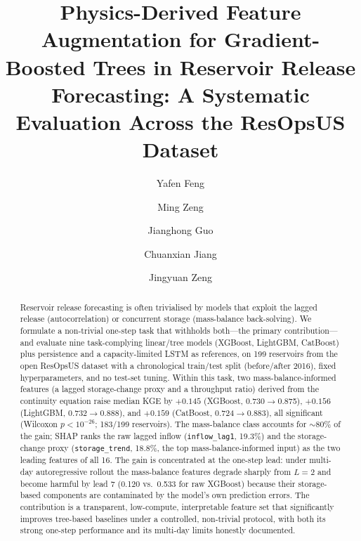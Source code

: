 \documentclass[journal]{ascelike-new}
\begin{document}
\title{Physics-Derived Feature Augmentation for Gradient-Boosted Trees in Reservoir Release Forecasting: A Systematic Evaluation Across the ResOpsUS Dataset}
\author[1,*]{Yafen Feng}
\author[2]{Ming Zeng}
\author[3]{Jianghong Guo}
\author[3]{Chuanxian Jiang}
\author[3,*]{Jingyuan Zeng}
\maketitle
\begin{abstract}
Reservoir release forecasting is often trivialised by models that exploit the lagged release (autocorrelation) or concurrent storage (mass-balance back-solving). We formulate a non-trivial one-step task that withholds both---the primary contribution---and evaluate nine task-complying linear/tree models (XGBoost, LightGBM, CatBoost) plus persistence and a capacity-limited LSTM as references, on 199 reservoirs from the open ResOpsUS dataset with a chronological train/test split (before/after 2016), fixed hyperparameters, and no test-set tuning. Within this task, two mass-balance-informed features (a lagged storage-change proxy and a throughput ratio) derived from the continuity equation raise median KGE by $+0.145$ (XGBoost, 0.730$\to$0.875), $+0.156$ (LightGBM, 0.732$\to$0.888), and $+0.159$ (CatBoost, 0.724$\to$0.883), all significant (Wilcoxon $p < 10^{-26}$; 183/199 reservoirs). The mass-balance class accounts for $\sim$80\% of the gain; SHAP ranks the raw lagged inflow (\texttt{inflow\_lag1}, 19.3\%) and the storage-change proxy (\texttt{storage\_trend}, 18.8\%, the top mass-balance-informed input) as the two leading features of all 16. The gain is concentrated at the one-step lead: under multi-day autoregressive rollout the mass-balance features degrade sharply from $L{=}2$ and become harmful by lead 7 (0.120 vs.\ 0.533 for raw XGBoost) because their storage-based components are contaminated by the model's own prediction errors. The contribution is a transparent, low-compute, interpretable feature set that significantly improves tree-based baselines under a controlled, non-trivial protocol, with both its strong one-step performance and its multi-day limits honestly documented.
\end{abstract}
\end{document}
